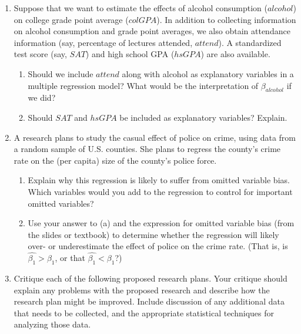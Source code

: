 \documentclass[
]{article}
\providecommand{\tightlist}{%
  \setlength{\itemsep}{0pt}\setlength{\parskip}{0pt}}
\begin{document}
\begin{enumerate}
\def\labelenumi{\arabic{enumi}.}
\item
  Suppose that we want to estimate the effects of alcohol consumption
  (\(alcohol\)) on college grade point average (\(colGPA\)). In addition
  to collecting information on alcohol consumption and grade point
  averages, we also obtain attendance information (say, percentage of
  lectures attended, \(attend\)). A standardized test score (say,
  \(SAT\)) and high school GPA (\(hsGPA\)) are also available.

  \begin{enumerate}
  \def\labelenumii{\alph{enumii}.}
  \tightlist
  \item
    Should we include \(attend\) along with alcohol as explanatory
    variables in a multiple regression model? What would be the
    interpretation of \(\beta_{alcohol}\) if we did?
  \item
    Should \(SAT\) and \(hsGPA\) be included as explanatory variables?
    Explain.
  \end{enumerate}
\item
  A research plans to study the casual effect of police on crime, using
  data from a random sample of U.S. counties. She plans to regress the
  county's crime rate on the (per capita) size of the county's police
  force.

  \begin{enumerate}
  \def\labelenumii{\alph{enumii}.}
  \tightlist
  \item
    Explain why this regression is likely to suffer from omitted
    variable bias. Which variables would you add to the regression to
    control for important omitted variables?
  \item
    Use your answer to (a) and the expression for omitted variable bias
    (from the slides or textbook) to determine whether the regression
    will likely over- or underestimate the effect of police on the crime
    rate. (That is, is \(\hat{\beta_1}>\beta_1\), or that
    \(\hat{\beta_1} < \beta_1\)?)
  \end{enumerate}
\item
  Critique each of the following proposed research plans. Your critique
  should explain any problems with the proposed research and describe
  how the research plan might be improved. Include discussion of any
  additional data that needs to be collected, and the appropriate
  statistical techniques for analyzing those data.


\end{enumerate}
\end{document}
